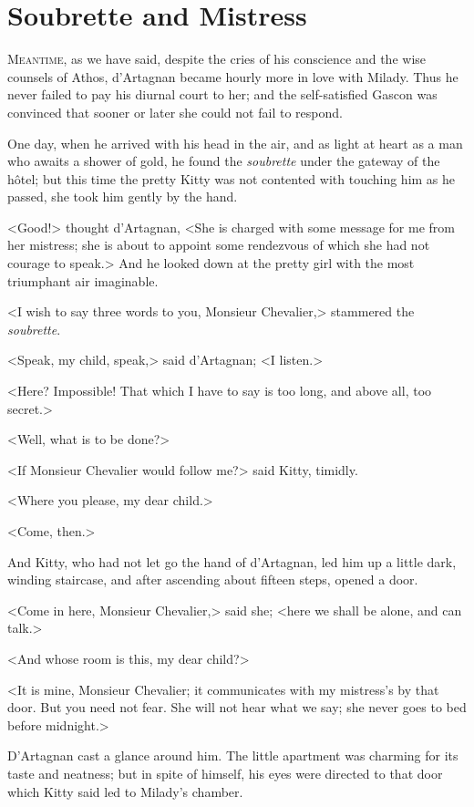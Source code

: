
\chapter{Soubrette and Mistress}

\lettrine[]{M}{eantime,} as we have said, despite the cries of his conscience and the wise counsels of Athos, d'Artagnan became hourly more in love with Milady. Thus he never failed to pay his diurnal court to her; and the self-satisfied Gascon was convinced that sooner or later she could not fail to respond. 

One day, when he arrived with his head in the air, and as light at heart as a man who awaits a shower of gold, he found the \textit{soubrette} under the gateway of the hôtel; but this time the pretty Kitty was not contented with touching him as he passed, she took him gently by the hand. 

<Good!> thought d'Artagnan, <She is charged with some message for me from her mistress; she is about to appoint some rendezvous of which she had not courage to speak.> And he looked down at the pretty girl with the most triumphant air imaginable. 

<I wish to say three words to you, Monsieur Chevalier,> stammered the \textit{soubrette}. 

<Speak, my child, speak,> said d'Artagnan; <I listen.> 

<Here? Impossible! That which I have to say is too long, and above all, too secret.> 

<Well, what is to be done?> 

<If Monsieur Chevalier would follow me?> said Kitty, timidly. 

<Where you please, my dear child.> 

<Come, then.> 

And Kitty, who had not let go the hand of d'Artagnan, led him up a little dark, winding staircase, and after ascending about fifteen steps, opened a door. 

<Come in here, Monsieur Chevalier,> said she; <here we shall be alone, and can talk.> 

<And whose room is this, my dear child?> 

<It is mine, Monsieur Chevalier; it communicates with my mistress's by that door. But you need not fear. She will not hear what we say; she never goes to bed before midnight.> 

D'Artagnan cast a glance around him. The little apartment was charming for its taste and neatness; but in spite of himself, his eyes were directed to that door which Kitty said led to Milady's chamber. 

